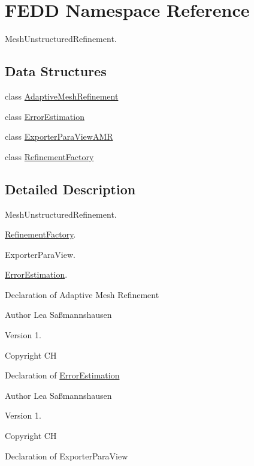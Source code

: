 \hypertarget{namespaceFEDD}{}\section{F\+E\+DD Namespace Reference}
\label{namespaceFEDD}


Mesh\+Unstructured\+Refinement.  


\subsection*{Data Structures}
\begin{DoxyCompactItemize}
\item 
class \hyperlink{classFEDD_1_1AdaptiveMeshRefinement}{Adaptive\+Mesh\+Refinement}
\item 
class \hyperlink{classFEDD_1_1ErrorEstimation}{Error\+Estimation}
\item 
class \hyperlink{classFEDD_1_1ExporterParaViewAMR}{Exporter\+Para\+View\+A\+MR}
\item 
class \hyperlink{classFEDD_1_1RefinementFactory}{Refinement\+Factory}
\end{DoxyCompactItemize}


\subsection{Detailed Description}
Mesh\+Unstructured\+Refinement. 

\hyperlink{classFEDD_1_1RefinementFactory}{Refinement\+Factory}.

Exporter\+Para\+View.

\hyperlink{classFEDD_1_1ErrorEstimation}{Error\+Estimation}.

Declaration of Adaptive Mesh Refinement

\begin{DoxyAuthor}{Author}
Lea Saßmannshausen 
\end{DoxyAuthor}
\begin{DoxyVersion}{Version}
1. 
\end{DoxyVersion}
\begin{DoxyCopyright}{Copyright}
CH
\end{DoxyCopyright}
Declaration of \hyperlink{classFEDD_1_1ErrorEstimation}{Error\+Estimation}

\begin{DoxyAuthor}{Author}
Lea Saßmannshausen 
\end{DoxyAuthor}
\begin{DoxyVersion}{Version}
1. 
\end{DoxyVersion}
\begin{DoxyCopyright}{Copyright}
CH
\end{DoxyCopyright}
Declaration of Exporter\+Para\+View

